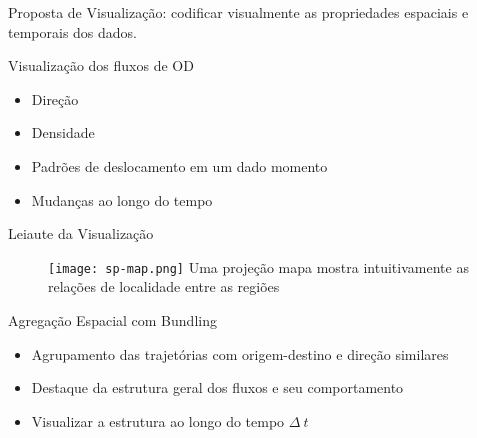 \begin{frame}[standout]
  Proposta de Visualização: codificar visualmente as propriedades espaciais
e temporais dos dados.
\end{frame}

\begin{frame}{Visualização dos fluxos de OD}
  \begin{itemize}
    \item Direção
    \item Densidade
    \item Padrões de deslocamento em um dado momento
    \item Mudanças ao longo do tempo
  \end{itemize}
\end{frame}

\begin{frame}{Leiaute da Visualização}
  \begin{figure}[ht!]
    \centering
    \texttt{[image: sp-map.png]}
  Uma projeção  mapa mostra intuitivamente as relações de localidade entre
as regiões
  \end{figure}
\end{frame}


\begin{frame}{Agregação Espacial com Bundling}
  \begin{itemize}
    \item Agrupamento das trajetórias com origem-destino e direção similares
    \item Destaque da estrutura geral dos fluxos e seu comportamento
    \item Visualizar a estrutura ao longo do tempo $\Delta~t$ 
  \end{itemize}
\end{frame}

